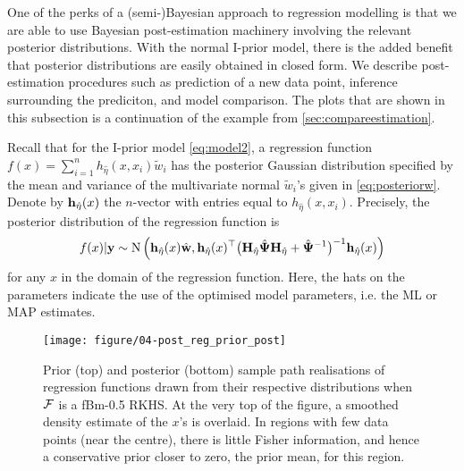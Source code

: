 One of the perks of a (semi-)Bayesian approach to regression modelling is that we are able to use Bayesian post-estimation machinery involving the relevant posterior distributions.
With the normal I-prior model, there is the added benefit that posterior distributions are easily obtained in closed form.
We describe post-estimation procedures such as prediction of a new data point, inference surrounding the prediciton, and model comparison.
The plots that are shown in this subsection is a continuation of the example from \cref{sec:compareestimation}.

Recall that for the I-prior model \cref{eq:model2}, a regression function $f(x) = \sum_{i=1}^n h_{\hat\eta}(x,x_i)\tilde w_i$
has the posterior Gaussian distribution specified by the mean and variance of the multivariate normal $\tilde w_i$'s given in \cref{eq:posteriorw}.
Denote by ${\mathbf h}_{\hat\eta}(x)$ the $n$-vector with entries equal to $h_{\hat\eta}(x,x_i)$.
Precisely, the posterior distribution of the regression function is
\begin{align}
  f(x) | {\mathbf y} \sim \operatorname{N} \Big( 
  {\mathbf h}_{\hat\eta}(x)\hat{{\mathbf w}}, 
  {\mathbf h}_{\hat\eta}(x)^\top \big({\mathbf H}_{\hat\eta}\hat{{\bm\Psi}}{\mathbf H}_{\hat\eta} + \hat{{\bm\Psi}}^{-1}\big)^{-1} {\mathbf h}_{\hat\eta}(x) 
  \Big)
\end{align}
for any $x$ in the domain of the regression function.
Here, the hats on the parameters indicate the use of the optimised model parameters, i.e. the ML or MAP estimates.

\begin{figure}[p]
  \centering
  \texttt{[image: figure/04-post\_reg\_prior\_post]}
  \caption[Prior and posterior sample path realisations]{Prior (top) and posterior (bottom) sample path realisations of regression functions drawn from their respective distributions when ${\mathcal F}$ is a fBm-0.5 RKHS. At the very top of the figure, a smoothed density estimate of the $x$'s is overlaid. In regions with few data points (near the centre), there is little Fisher information, and hence a conservative prior closer to zero, the prior mean, for this region.}
\end{figure}

